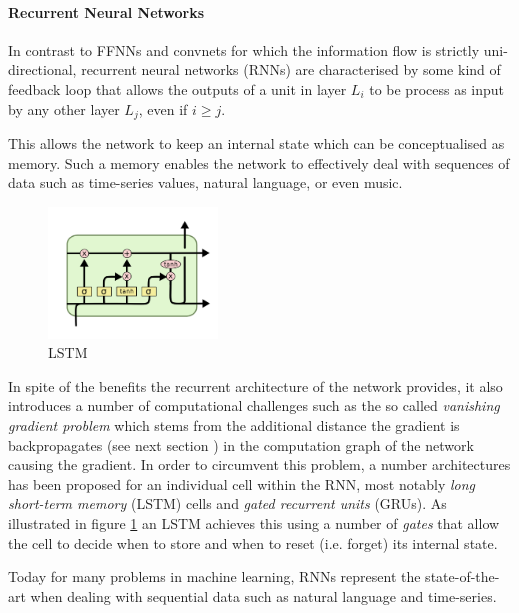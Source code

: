\paragraph{Recurrent Neural Networks} In contrast to FFNNs and convnets for which the information flow is strictly uni-directional, recurrent neural networks (RNNs) are characterised by some kind of feedback loop that allows the outputs of a unit in layer $L_i$ to be process as input by any other layer $L_j$, even if $i \geq j$.

This allows the network to keep an internal state which can be conceptualised as memory. Such a memory enables the network to effectively deal with sequences of data such as time-series values, natural language, or even music. 


\begin{figure}
	\centering
	\includegraphics[width=0.4\textwidth]{figures/chapter-2/lstm.png}
	\caption{LSTM}\label{fig:lstm}   
\end{figure}

In spite of the benefits the recurrent architecture of the network provides, it also introduces a number of computational challenges such as the so called \emph{vanishing gradient problem} which stems from the additional distance the gradient is backpropagates (see next section %
) in the computation graph of the network causing the gradient. In order to circumvent this problem, a number architectures has been proposed for an individual cell within the RNN, most notably \emph{long short-term memory} (LSTM) cells and \emph{gated recurrent units} (GRUs). As illustrated in figure \ref{fig:lstm} an LSTM achieves this using a number of \emph{gates} that allow the cell to decide when to store and when to reset (i.e. forget) its internal state. 

Today for many problems in machine learning, RNNs represent the state-of-the-art when dealing with sequential data such as natural language and time-series. 



